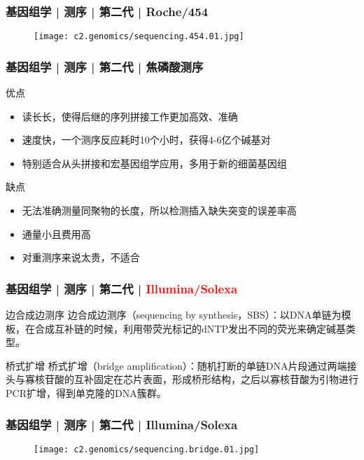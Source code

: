 \begin{frame}
  \frametitle{基因组学 | 测序 | 第二代 | Roche/454}
  \begin{figure}
    \centering
    \texttt{[image: c2.genomics/sequencing.454.01.jpg]}
  \end{figure}
\end{frame}

\begin{frame}
  \frametitle{基因组学 | 测序 | 第二代 | 焦磷酸测序}
  \begin{block}{优点}
    \begin{itemize}
      \item 读长长，使得后继的序列拼接工作更加高效、准确
      \item 速度快，一个测序反应耗时10个小时，获得4-6亿个碱基对
      \item 特别适合从头拼接和宏基因组学应用，多用于新的细菌基因组
    \end{itemize}
  \end{block}
  \pause
  \begin{block}{缺点}
    \begin{itemize}
      \item 无法准确测量同聚物的长度，所以检测插入缺失突变的误差率高
      \item 通量小且费用高
      \item 对重测序来说太贵，不适合
    \end{itemize}
  \end{block}
\end{frame}

\begin{frame}
  \frametitle{基因组学 | 测序 | 第二代 | \textcolor{red}{Illumina/Solexa}}
  \begin{block}{边合成边测序}
边合成边测序（sequencing by synthesis，SBS）：以DNA单链为模板，在合成互补链的时候，利用带荧光标记的dNTP发出不同的荧光来确定碱基类型。
  \end{block}
  \pause
  \begin{block}{桥式扩增}
桥式扩增（bridge amplification）：随机打断的单链DNA片段通过两端接头与寡核苷酸的互补固定在芯片表面，形成桥形结构，之后以寡核苷酸为引物进行PCR扩增，得到单克隆的DNA簇群。
  \end{block}
\end{frame}

\begin{frame}
  \frametitle{基因组学 | 测序 | 第二代 | Illumina/Solexa}
  \begin{figure}
    \centering
    \texttt{[image: c2.genomics/sequencing.bridge.01.jpg]}
  \end{figure}
\end{frame}

